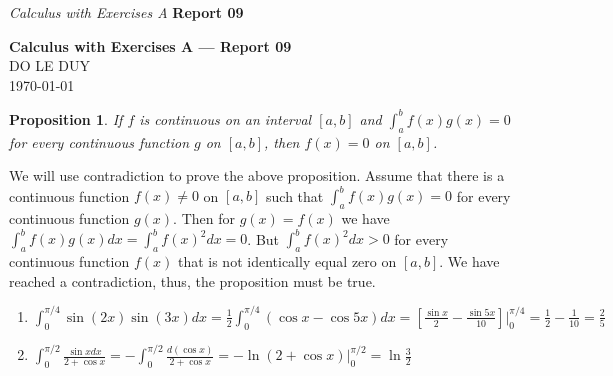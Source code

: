 
\newcommand{\myclass}{Calculus with Exercises A}
\newcommand{\myname}{DO LE DUY}
\newcommand{\myhwtype}{Report 09}
\newcommand{\questiontype}{Problem}
\newcommand{\writtensection}{9}

\headrule
\header{{\myname}}%
{\emph{\myclass}}%
{\textbf{\myhwtype }}
\newtheorem*{prop}{Proposition}

\thispagestyle{empty}
\begin{center}
  {\Large \textbf{\myclass{} — \myhwtype{} }} \\
  {\myname{} } \\
  \today
\end{center}

\begin{numedquestion}
    \begin{prop}
        If $f$ is continuous on an interval $[a,b]$ and $\int^b_a f(x)g(x) = 0$ for every continuous function $g$ on $[a,b]$, then $f(x)=0$ on $[a,b]$.
    \end{prop} 
    We will use contradiction to prove the above proposition. Assume that there is a continuous function $f(x) \neq 0$ on $[a,b]$ such that $\int ^b _a f(x)g(x) = 0$ for every continuous function $g(x)$. Then for $g(x) = f(x)$ we have $\int ^b _a f(x)g(x)dx = \int ^b _a f(x)^2dx = 0$. But $\int ^b _a f(x)^2dx > 0$ for every continuous function $f(x)$ that is not identically equal zero on $[a,b]$. We have reached a contradiction, thus, the proposition must be true. 
\end{numedquestion}  

\begin{numedquestion}
    \begin{enumerate}[label = {(\arabic*)}]
        \item $\int^{\pi/4}_0 \sin(2x)\sin(3x)dx = \frac{1}{2}\int^{\pi/4}_0 (\cos x - \cos 5x)dx = \left[\frac{\sin x}{2} - \frac{\sin 5x}{10}\right] \Big|_0^{\pi/4} = \frac{1}{2} - \frac{1}{10}  = \frac{2}{5}$ 
        \item $\int^{\pi/2}_0 \frac{\sin x dx}{2 + \cos x} = -\int^{\pi/2}_{0} \frac{d(\cos x)}{2 +\cos x} = -\ln (2+ \cos x) \Big|_0^{\pi/2}= \ln \frac{3}{2} $
    \end{enumerate}
\end{numedquestion}

